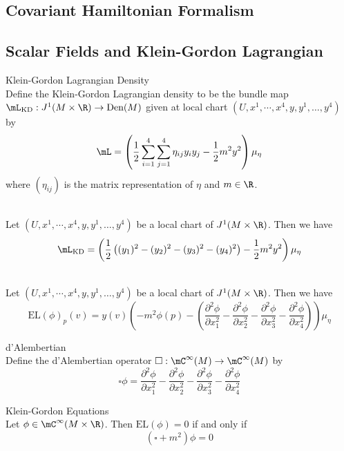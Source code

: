 \documentclass[a4paper]{article}
\begin{document}
\subsection{Covariant Hamiltonian Formalism}

\subsection{Scalar Fields and Klein-Gordon Lagrangian}
\begin{defn}{Klein-Gordon Lagrangian Density}{}\\
Define the Klein-Gordon Lagrangian density to be the bundle map $\mL_\text{KD}:J^1(M\times\R)\to\text{Den}(M)$ given at local chart $(U,x^1,\cdots,x^4,y,y^1,\dots,y^4)$ by $$\mL=\left(\frac{1}{2}\sum_{i=1}^4\sum_{j=1}^4\eta_{ij}y_iy_j-\frac{1}{2}m^2y^2\right)\mu_\eta$$ where $(\eta_{ij})$ is the matrix representation of $\eta$ and $m\in\R$. 
\end{defn}

\begin{lmm}{}{}\\
Let $(U,x^1,\cdots,x^4,y,y^1,\dots,y^4)$ be a local chart of $J^1(M\times\R)$. Then we have $$\mL_\text{KD}=\left(\frac{1}{2}\left((y_1)^2-(y_2)^2-(y_3)^2-(y_4)^2\right)-\frac{1}{2}m^2y^2\right)\mu_\eta$$
\end{lmm}

\begin{lmm}{}{}\\
Let $(U,x^1,\cdots,x^4,y,y^1,\dots,y^4)$ be a local chart of $J^1(M\times\R)$. Then we have $$\text{EL}(\phi)_p(v)=y(v)\left(-m^2\phi(p)-\left(\frac{\partial^2\phi}{\partial x_1^2}-\frac{\partial^2\phi}{\partial x_2^2}-\frac{\partial^2\phi}{\partial x_3^2}-\frac{\partial^2\phi}{\partial x_4^2}\right)\right)\mu_\eta$$
\end{lmm}

\begin{defn}{d'Alembertian}{}\\
Define the d'Alembertian operator $\square:\mC^\infty(M)\to\mC^\infty(M)$ by $$\square\phi=\frac{\partial^2\phi}{\partial x_1^2}-\frac{\partial^2\phi}{\partial x_2^2}-\frac{\partial^2\phi}{\partial x_3^2}-\frac{\partial^2\phi}{\partial x_4^2}$$
\end{defn}

\begin{thm}{Klein-Gordon Equations}{}\\
Let $\phi\in\mC^\infty(M\times\R)$. Then $\text{EL}(\phi)=0$ if and only if $$(\square+m^2)\phi=0$$
\end{thm}
\end{document}
